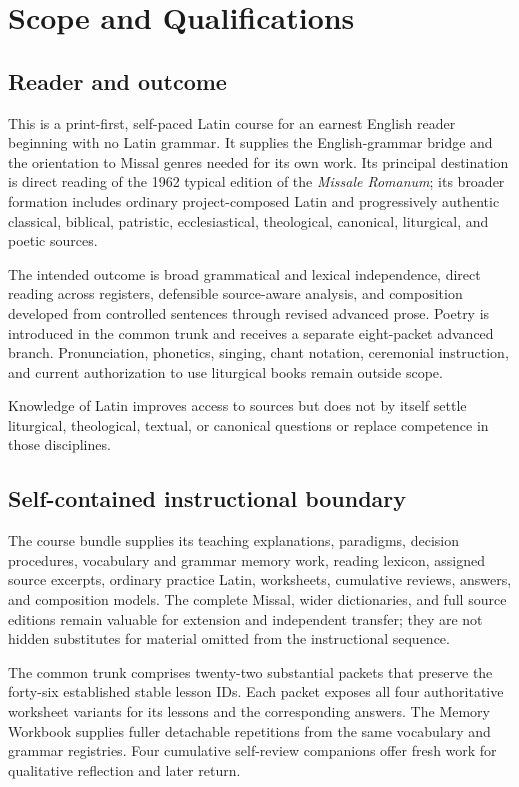 \chapter{Scope and Qualifications}

\section{Reader and outcome}

This is a print-first, self-paced Latin course for an earnest English reader
beginning with no Latin grammar. It supplies the English-grammar bridge and
the orientation to Missal genres needed for its own work. Its principal
destination is direct reading of the 1962 typical edition of the
\emph{Missale Romanum}; its broader formation includes ordinary
project-composed Latin and progressively authentic classical, biblical,
patristic, ecclesiastical, theological, canonical, liturgical, and poetic
sources.

The intended outcome is broad grammatical and lexical independence, direct
reading across registers, defensible source-aware analysis, and composition
developed from controlled sentences through revised advanced prose. Poetry is
introduced in the common trunk and receives a separate eight-packet advanced
branch. Pronunciation, phonetics, singing, chant notation, ceremonial
instruction, and current authorization to use liturgical books remain outside
scope.

Knowledge of Latin improves access to sources but does not by itself settle
liturgical, theological, textual, or canonical questions or replace
competence in those disciplines.

\section{Self-contained instructional boundary}

The course bundle supplies its teaching explanations, paradigms, decision
procedures, vocabulary and grammar memory work, reading lexicon, assigned
source excerpts, ordinary practice Latin, worksheets, cumulative reviews,
answers, and composition models. The complete Missal, wider dictionaries, and
full source editions remain valuable for extension and independent transfer;
they are not hidden substitutes for material omitted from the instructional
sequence.

The common trunk comprises twenty-two substantial packets that preserve the
forty-six established stable lesson IDs. Each packet exposes all four
authoritative worksheet variants for its lessons and the corresponding
answers. The Memory Workbook supplies fuller detachable repetitions from the
same vocabulary and grammar registries. Four cumulative self-review companions
offer fresh work for qualitative reflection and later return.

